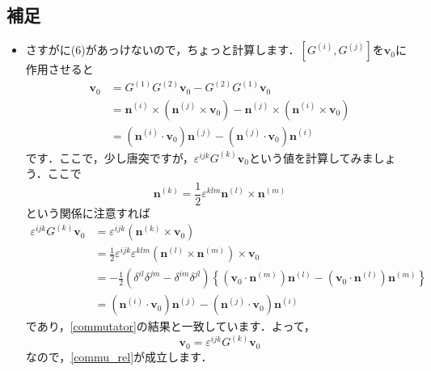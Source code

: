 \documentclass[a4paper,pdflatex,ja=standard]{bxjsarticle}
\begin{document}
\subsection*{補足}

\begin{itemize}
  \item 
  さすがに(6)があっけないので，ちょっと計算します．$[G^{(i)},G^{(j)}]$を$\bm{v}_0$に作用させると
  \begin{align}
    [G^{(i)},G^{(j)}]
    \bm{v}_0
    &=
    G^{(1)}G^{(2)}\bm{v}_0
    -
    G^{(2)}G^{(1)}\bm{v}_0
    \nonumber
    \\
    &=
    \bm{n}^{(i)}\times(\bm{n}^{(j)}\times\bm{v}_0)
    -
    \bm{n}^{(j)}\times(\bm{n}^{(i)}\times\bm{v}_0)
    \nonumber
    \\
    &=
    (\bm{n}^{(i)}\cdot\bm{v}_0)\bm{n}^{(j)}
    -
    (\bm{n}^{(j)}\cdot\bm{v}_0)\bm{n}^{(i)}
    \label{commutator}
  \end{align}
  です．ここで，少し唐突ですが，$\varepsilon^{ijk}G^{(k)}\bm{v}_0$という値を計算してみましょう．ここで
  \begin{equation}
    \bm{n}^{(k)}
    =
    \frac{1}{2}\varepsilon^{klm}\bm{n}^{(l)}\times\bm{n}^{(m)}
  \end{equation}
  という関係に注意すれば
  \begin{align}
    \varepsilon^{ijk}G^{(k)}\bm{v}_0
    &=
    \varepsilon^{ijk}
    (\bm{n}^{(k)}\times\bm{v}_0)
    \nonumber
    \\
    &=
    \frac{1}{2}
    \varepsilon^{ijk}
    \varepsilon^{klm}(\bm{n}^{(l)}\times\bm{n}^{(m)})\times\bm{v}_0
    \nonumber
    \\
    &=
    -\frac{1}{2}
    (\delta^{il}\delta^{jm}-\delta^{im}\delta^{jl})
    \left\{  
      (\bm{v}_0\cdot\bm{n}^{(m)})\bm{n}^{(l)}
      -
      (\bm{v}_0\cdot\bm{n}^{(l)})\bm{n}^{(m)}
    \right\}
    \nonumber
    \\
    &=    
    (\bm{n}^{(i)}\cdot\bm{v}_0)\bm{n}^{(j)}
    -
    (\bm{n}^{(j)}\cdot\bm{v}_0)\bm{n}^{(i)}
  \end{align}
  であり，\eqref{commutator}の結果と一致しています．よって，
  \begin{equation}
    [G^{(i)},G^{(j)}]
    \bm{v}_0
    =
    \varepsilon^{ijk}G^{(k)}\bm{v}_0
  \end{equation}
  なので，\eqref{commu_rel}が成立します．

\end{itemize}
\end{document}
